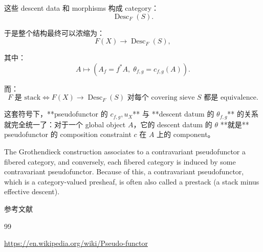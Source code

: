 \documentclass{beamer}
\begin{document}
\begin{frame}
这些 descent data 和 morphisms 构成 category：
$$
\boxed{
\operatorname{Desc}_F(S).
}
$$

于是整个结构最终可以浓缩为：
$$
\boxed{
F(X)
\longrightarrow
\operatorname{Desc}_F(S),
}
$$

其中：
$$
\boxed{
A
\longmapsto
\left(
A_f=f^*A,\;
\theta_{f,g}=c_{f,g}(A)
\right).
}
$$

而：
$$
\boxed{
\text{\(F\) 是 stack}
\iff
F(X)\longrightarrow\operatorname{Desc}_F(S)
\text{ 对每个 covering sieve \(S\) 都是 equivalence}.
}
$$
\begin{markdown}
这套符号下，**pseudofunctor 的 $c_{f,g},u_X$** 与 **descent datum 的 $\theta_{f,g}$** 的关系就完全统一了：对于一个 global object $A$，它的 descent datum 的 $\theta$ **就是** pseudofunctor 的 composition constraint $c$ 在 $A$ 上的 component。
\end{markdown}
\end{frame}

\begin{frame}
The Grothendieck construction associates to a contravariant pseudofunctor a fibered category, and conversely, each fibered category is induced by some contravariant pseudofunctor. Because of this, a contravariant pseudofunctor, which is a category-valued presheaf, is often also called a prestack (a stack minus effective descent).\cite{wiki_pseudofunctor}
\end{frame}

\begin{frame}[allowframebreaks]{参考文献}
\begin{thebibliography}{99}

\url{https://en.wikipedia.org/wiki/Pseudo-functor}

\end{thebibliography}
\end{frame}
\end{document}
